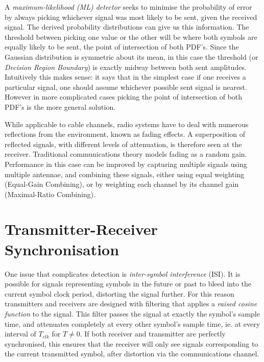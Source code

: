 A \emph{maximum-likelihood (ML) detector} seeks to minimise the probability of
error by always picking whichever signal was most likely to be sent, given
the received signal. The derived probability distributions can give us this information. The threshold between picking one value or the other
will be where both symbols are equally likely to be sent, the point of
intersection of both PDF's. Since the Gaussian distribution is symmetric
about its mean, in this case the threshold (or \emph{Decision Region
Boundary}) is exactly midway between both sent amplitudes. Intuitively
this makes sense: it says that in the simplest case if one receives a particular
signal, one should assume whichever possible sent signal is nearest. However in more complicated cases picking the point of intersection of both PDF's
is the more general solution. 

While applicable to cable channels, radio systems have to deal with numerous reflections from the environment, known as fading effects. A superposition of reflected signals, with different levels of attenuation, is therefore seen at the receiver. Traditional communications theory models fading as a random gain. Performance in this case can be improved by capturing multiple signals using multiple antennae, and combining these signals, either using equal weighting (Equal-Gain Combining), or by weighting each channel by its channel gain (Maximal-Ratio Combining).

\section{Transmitter-Receiver Synchronisation}

One issue that complicates detection is \emph{inter-symbol
interference} (ISI). It is possible for signals representing symbols in
the future or past to bleed into the current symbol clock period,
distorting the signal further. For this reason transmitters and receivers
are designed with filtering that applies a \emph{raised cosine function} to the signal.
This filter passes the signal at exactly the symbol's sample time, and attenuates
completely at every other symbol's sample time, ie. at every interval of
$T_{clk}$ for $T \neq 0$. If both receiver and transmitter are perfectly
synchronised, this ensures that the receiver will only see signals
corresponding to the current transmitted symbol, after distortion via
the communications channel.

